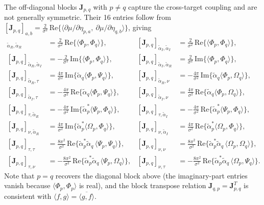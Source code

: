 \documentclass[11pt]{article}
\begin{document}
The off-diagonal blocks \(\bm{J}_{p,q}\) with \(p \neq q\) capture the cross-target coupling and are not generally symmetric. Their 16 entries follow from \([\bm{J}_{p,q}]_{a,b} = \tfrac{2}{\sigma^2}\, \text{Re}\{ \langle \partial \mu / \partial \eta_{p,a},\ \partial \mu / \partial \eta_{q,b} \rangle \}\), giving
\begin{align}
    [\bm{J}_{p,q}]_{\tilde{\alpha}_R,\tilde{\alpha}_R} &= \tfrac{2}{\sigma^2}\, \text{Re}\{ \langle \Phi_p,\Phi_q \rangle \}, &
    [\bm{J}_{p,q}]_{\tilde{\alpha}_I,\tilde{\alpha}_I} &= \tfrac{2}{\sigma^2}\, \text{Re}\{ \langle \Phi_p,\Phi_q \rangle \}, \\
    [\bm{J}_{p,q}]_{\tilde{\alpha}_R,\tilde{\alpha}_I} &= -\tfrac{2}{\sigma^2}\, \text{Im}\{ \langle \Phi_p,\Phi_q \rangle \}, &
    [\bm{J}_{p,q}]_{\tilde{\alpha}_I,\tilde{\alpha}_R} &= \tfrac{2}{\sigma^2}\, \text{Im}\{ \langle \Phi_p,\Phi_q \rangle \}, \\
    [\bm{J}_{p,q}]_{\tilde{\alpha}_R,\tau} &= \tfrac{4\pi}{\sigma^2}\, \text{Im}\{ \tilde{\alpha}_q \langle \Phi_p,\Psi_q \rangle \}, &
    [\bm{J}_{p,q}]_{\tilde{\alpha}_R,\nu} &= -\tfrac{4\pi}{\sigma^2}\, \text{Im}\{ \tilde{\alpha}_q \langle \Phi_p,\Omega_q \rangle \}, \\
    [\bm{J}_{p,q}]_{\tilde{\alpha}_I,\tau} &= -\tfrac{4\pi}{\sigma^2}\, \text{Re}\{ \tilde{\alpha}_q \langle \Phi_p,\Psi_q \rangle \}, &
    [\bm{J}_{p,q}]_{\tilde{\alpha}_I,\nu} &= \tfrac{4\pi}{\sigma^2}\, \text{Re}\{ \tilde{\alpha}_q \langle \Phi_p,\Omega_q \rangle \}, \\
    [\bm{J}_{p,q}]_{\tau,\tilde{\alpha}_R} &= -\tfrac{4\pi}{\sigma^2}\, \text{Im}\{ \tilde{\alpha}_p^* \langle \Psi_p,\Phi_q \rangle \}, &
    [\bm{J}_{p,q}]_{\tau,\tilde{\alpha}_I} &= -\tfrac{4\pi}{\sigma^2}\, \text{Re}\{ \tilde{\alpha}_p^* \langle \Psi_p,\Phi_q \rangle \}, \\
    [\bm{J}_{p,q}]_{\nu,\tilde{\alpha}_R} &= \tfrac{4\pi}{\sigma^2}\, \text{Im}\{ \tilde{\alpha}_p^* \langle \Omega_p,\Phi_q \rangle \}, &
    [\bm{J}_{p,q}]_{\nu,\tilde{\alpha}_I} &= \tfrac{4\pi}{\sigma^2}\, \text{Re}\{ \tilde{\alpha}_p^* \langle \Omega_p,\Phi_q \rangle \}, \\
    [\bm{J}_{p,q}]_{\tau,\tau} &= \tfrac{8\pi^2}{\sigma^2}\, \text{Re}\{ \tilde{\alpha}_p^* \tilde{\alpha}_q\, \langle \Psi_p,\Psi_q \rangle \}, &
    [\bm{J}_{p,q}]_{\nu,\nu} &= \tfrac{8\pi^2}{\sigma^2}\, \text{Re}\{ \tilde{\alpha}_p^* \tilde{\alpha}_q\, \langle \Omega_p,\Omega_q \rangle \}, \\
    [\bm{J}_{p,q}]_{\tau,\nu} &= -\tfrac{8\pi^2}{\sigma^2}\, \text{Re}\{ \tilde{\alpha}_p^* \tilde{\alpha}_q\, \langle \Psi_p,\Omega_q \rangle \}, &
    [\bm{J}_{p,q}]_{\nu,\tau} &= -\tfrac{8\pi^2}{\sigma^2}\, \text{Re}\{ \tilde{\alpha}_p^* \tilde{\alpha}_q\, \langle \Omega_p,\Psi_q \rangle \}.
\end{align}
Note that \(p=q\) recovers the diagonal block above (the imaginary-part entries vanish because \(\langle \Phi_p,\Phi_p \rangle\) is real), and the block transpose relation \(\bm{J}_{q,p} = \bm{J}_{p,q}^T\) is consistent with \(\langle f,g \rangle = \overline{\langle g,f \rangle}\).
\end{document}
